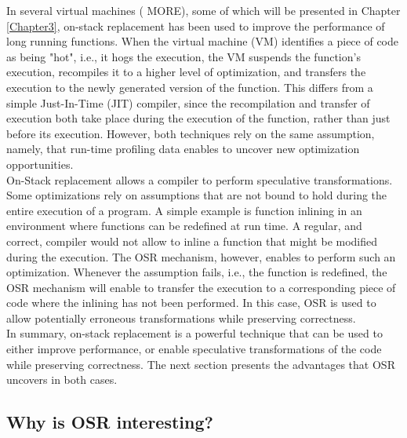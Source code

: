 In several virtual machines (\cite{paleczny2001java, lameed2013modular} MORE), some of which will be presented in Chapter \ref{Chapter3}, on-stack replacement has been used to improve the performance of long running functions.
When the virtual machine (VM) identifies a piece of code as being "hot", i.e., it hogs the execution, the VM suspends the function's execution, recompiles it to a higher level of optimization, and transfers the execution to the newly generated version of the function.
This differs from a simple Just-In-Time (JIT) compiler, since the recompilation and transfer of execution both take place during the execution of the function, rather than just before its execution.
However, both techniques rely on the same assumption, namely, that run-time profiling data enables to uncover new optimization opportunities.\\

On-Stack replacement allows a compiler to perform speculative transformations.
Some optimizations rely on assumptions that are not bound to hold during the entire execution of a program.
A simple example is function inlining in an environment where functions can be redefined at run time.
A regular, and correct, compiler would not allow to inline a function that might be modified during the execution.
The OSR mechanism, however, enables to perform such an optimization.
Whenever the assumption fails, i.e., the function is redefined, the OSR mechanism will enable to transfer the execution to a corresponding piece of code where the inlining has not been performed.
In this case, OSR is used to allow potentially erroneous transformations while preserving correctness.\\

In summary, on-stack replacement is a powerful technique that can be used to either improve performance, or enable speculative transformations of the code while preserving correctness.
The next section presents the advantages that OSR uncovers in both cases.

\subsection{Why is OSR interesting?}\label{WhyOSRInteresting}
    
